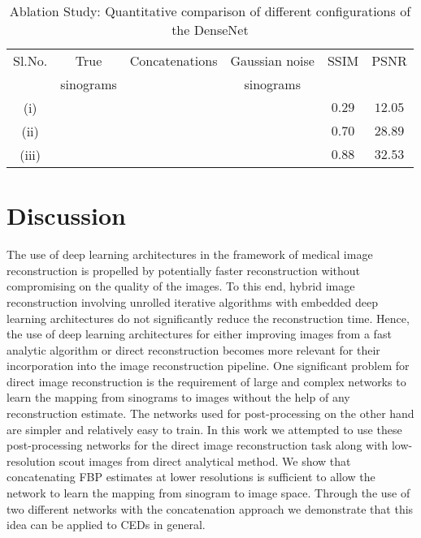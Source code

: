 \begin{table}[ht!]
\centering
\caption{Ablation Study: Quantitative comparison of different configurations of the DenseNet}
\label{table:7}
\begin{tabular}{||c|c|c|c|c|c||} 
	\hline
	Sl.No.    & True      & Concatenations   & Gaussian noise &    \ac{SSIM} &  \ac{PSNR}      \\ %
	& sinograms &                  &  sinograms     &              &                 \\
	\hline\hline
	(i)        &\cmark    &    \xmark       &    \xmark     &    $0.29$    &  $12.05$         \\     
	\hline
	(ii)       &\xmark    &    \cmark       &    \cmark     &    $0.70$    &  $28.89$         \\
	\hline  
	(iii)       &\cmark    &    \cmark       &    \xmark     &  $\bm{0.88}$ & $\bm{32.53}$     \\ 
	\hline
\end{tabular}

\end{table}


\section{Discussion} \label{sec:discussion}

The use of deep learning architectures in the framework of medical image reconstruction is propelled by potentially faster reconstruction without compromising on the quality of the images. To this end, hybrid image reconstruction involving unrolled iterative algorithms with embedded deep learning architectures do not significantly reduce the reconstruction time. Hence, the use of deep learning architectures for either improving images from a fast analytic algorithm or direct reconstruction becomes more relevant for their incorporation into the image reconstruction pipeline. One significant problem for direct image reconstruction is the requirement of large and complex networks to learn the mapping from sinograms to images without the help of any reconstruction estimate. The networks used for post-processing on the other hand are simpler and relatively easy to train. In this work we attempted to use these post-processing networks for the direct image reconstruction task along with low-resolution scout images from direct analytical method. We show that concatenating \ac{FBP} estimates at lower resolutions is sufficient to allow the network to learn the mapping from sinogram to image space. Through the use of two different networks with the concatenation approach we demonstrate that this idea can be applied to \acp{CED} in general.   

